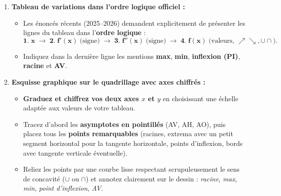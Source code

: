 \begin{astuce}
\begin{enumerate}
    \begin{itemize}
        \item Depuis 2024, l'énoncé fournit une \textbf{Aide numérique} (par ex. $\sqrt{2} \simeq 1,414$, $\sqrt{5} \simeq 2,236$, $e^{-1} \simeq 0,368$, $e^{-2} \simeq 0,135$, $\ln(2) \simeq 0,693$, $\pi^2 \simeq 9,87$).
        \item Calculez au brouillon, puis reportez dans le tableau la \textbf{valeur mathématique exacte ET la valeur décimale approchée} de $f(x)$ (et de $f'(x)$ si demandé) en chaque point remarquable : c'est indispensable pour placer les points au bon endroit sur le quadrillage !
    \end{itemize}
    \item \textbf{Tableau de variations dans l'ordre logique officiel :}
    \begin{itemize}
        \item Les énoncés récents (2025--2026) demandent explicitement de présenter les lignes du tableau dans l'\textbf{ordre logique} :
        \[
            \mathbf{1.\; x} \;\to\; \mathbf{2.\; f'(x)} \;\text{(signe)} \;\to\; \mathbf{3.\; f''(x)} \;\text{(signe)} \;\to\; \mathbf{4.\; f(x)} \;\text{(valeurs, } \nearrow\searrow, \cup\cap\text{)}.
        \]
        \item Indiquez dans la dernière ligne les mentions \textbf{max}, \textbf{min}, \textbf{inflexion (PI)}, \textbf{racine} et \textbf{AV}.
    \end{itemize}
    \item \textbf{Esquisse graphique sur le quadrillage avec axes chiffrés :}
    \begin{itemize}
        \item \textbf{Graduez et chiffrez vos deux axes $x$ et $y$} en choisissant une échelle adaptée aux valeurs de votre tableau.
        \item Tracez d'abord les \textbf{asymptotes en pointillés} (AV, AH, AO), puis placez tous les \textbf{points remarquables} (racines, extrema avec un petit segment horizontal pour la tangente horizontale, points d'inflexion, bords avec tangente verticale éventuelle).
        \item Reliez les points par une courbe lisse respectant scrupuleusement le sens de concavité ($\cup$ ou $\cap$) et annotez clairement sur le dessin : \emph{racine}, \emph{max}, \emph{min}, \emph{point d'inflexion}, \emph{AV}.
    \end{itemize}
\end{enumerate}
\end{astuce}

